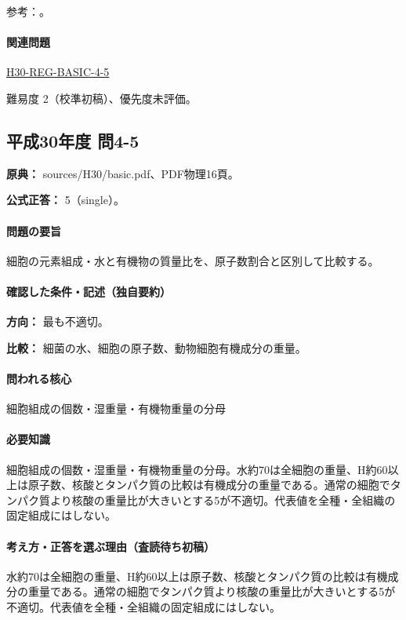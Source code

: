 \par 参考：\cite{bio_composition}。

\paragraph{関連問題} \hyperref[q:h30-reg-basic-4-5]{H30-REG-BASIC-4-5}

\par 難易度 2（校準初稿）、優先度未評価。

\subsection{平成30年度 問4-5}
\label{q:h30-reg-basic-4-5}

\noindent\textbf{原典：} sources/H30/basic.pdf、PDF物理16頁。

\textbf{公式正答：} 5（single）。

\paragraph{問題の要旨} 細胞の元素組成・水と有機物の質量比を、原子数割合と区別して比較する。

\paragraph{確認した条件・記述（独自要約）}\mbox{}\par

\noindent\textbf{方向：} 最も不適切。\par

\noindent\textbf{比較：} 細菌の水、細胞の原子数、動物細胞有機成分の重量。\par

\paragraph{問われる核心} 細胞組成の個数・湿重量・有機物重量の分母

\paragraph{必要知識} 細胞組成の個数・湿重量・有機物重量の分母。水約70は全細胞の重量、H約60以上は原子数、核酸とタンパク質の比較は有機成分の重量である。通常の細胞でタンパク質より核酸の重量比が大きいとする5が不適切。代表値を全種・全組織の固定組成にはしない。

\paragraph{考え方・正答を選ぶ理由（査読待ち初稿）} 水約70は全細胞の重量、H約60以上は原子数、核酸とタンパク質の比較は有機成分の重量である。通常の細胞でタンパク質より核酸の重量比が大きいとする5が不適切。代表値を全種・全組織の固定組成にはしない。

